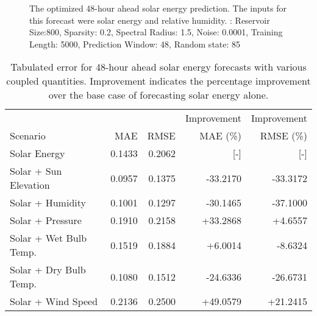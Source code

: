 \begin{figure*}[h]
  \centering
  
  \caption{The optimized 48-hour ahead solar energy prediction. The inputs for this forecast were solar energy and relative humidity. : Reservoir Size:800, Sparsity: 0.2, Spectral Radius: 1.5, Noise: 0.0001, Training Length: 5000, Prediction Window: 48, Random state: 85}
  \label{fig:solar48}
\end{figure*}
  \begin{table*}[h]
    \centering
    \caption{Tabulated error for 48-hour ahead solar energy forecasts with various coupled quantities. Improvement indicates the percentage improvement over the base case of forecasting solar energy alone.}
    \label{tab:solar48}
    \begin{tabular}{l|r|r|r|r}
      &  & & Improvement & Improvement \\
      Scenario  & MAE & RMSE & MAE (\%) & RMSE (\%)\\
      \hline
      Solar Energy & 0.1433 &0.2062 & [-] & [-] \\
      Solar + Sun Elevation & 0.0957 & 0.1375 &  -33.2170 & -33.3172 \\
      Solar + Humidity & 0.1001 & 0.1297 & -30.1465 & -37.1000 \\
      Solar + Pressure & 0.1910 & 0.2158 & +33.2868 & +4.6557 \\
      Solar + Wet Bulb Temp. & 0.1519 & 0.1884 & +6.0014 & -8.6324 \\
      Solar + Dry Bulb Temp. & 0.1080 & 0.1512 & -24.6336 & -26.6731 \\
      Solar + Wind Speed & 0.2136 & 0.2500 & +49.0579 & +21.2415 \\
    \end{tabular}
  \end{table*}
